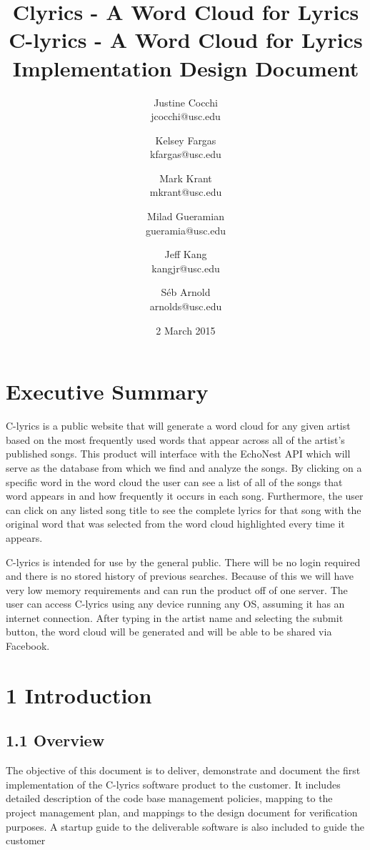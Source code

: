 \documentclass[]{article}
\title{Clyrics - A Word Cloud for Lyrics}
\author{Justine Cocchi\\jcocchi@usc.edu \and Kelsey Fargas\\kfargas@usc.edu \and Mark Krant \\ mkrant@usc.edu\and Milad Gueramian\\gueramia@usc.edu \and Jeff Kang\\kangjr@usc.edu \and Séb Arnold\\arnolds@usc.edu}
\date{2 March 2015}
\title{%
	C-lyrics - A Word Cloud for Lyrics \\
	\large Implementation Design Document}
\begin{document}
\clearpage\maketitle
\thispagestyle{empty}

\pagebreak

\tableofcontents
\setcounter{tocdepth}{4}
\thispagestyle{empty}

\pagebreak

\section{Executive Summary}\label{executive-summary}

C-lyrics is a public website that will generate a word cloud for any
given artist based on the most frequently used words that appear across
all of the artist's published songs. This product will interface with
the EchoNest API which will serve as the database from which we find and
analyze the songs. By clicking on a specific word in the word cloud the
user can see a list of all of the songs that word appears in and how
frequently it occurs in each song. Furthermore, the user can click on
any listed song title to see the complete lyrics for that song with the
original word that was selected from the word cloud highlighted every
time it appears.

C-lyrics is intended for use by the general public. There will be no
login required and there is no stored history of previous searches.
Because of this we will have very low memory requirements and can run
the product off of one server. The user can access C-lyrics using any
device running any OS, assuming it has an internet connection. After
typing in the artist name and selecting the submit button, the word
cloud will be generated and will be able to be shared via Facebook.

\pagebreak

\section{\textbf{1 Introduction}}\label{introduction}

\subsection{\textbf{1.1 Overview}}\label{overview}

The objective of this document is to deliver, demonstrate and document
the first implementation of the C-lyrics software product to the
customer. It includes detailed description of the code base management
policies, mapping to the project management plan, and mappings to the
design document for verification purposes. A startup guide to the
deliverable software is also included to guide the customer
\end{document}
